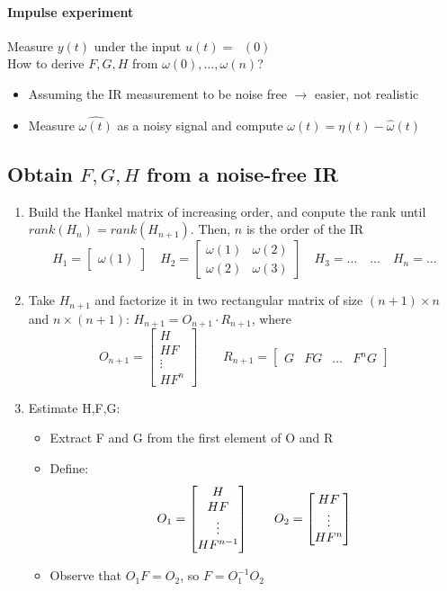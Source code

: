 \documentclass{report}
\DeclareMathOperator{\imp}{impulse(0)}
\begin{document}
\paragraph{Impulse experiment} Measure $y(t)$ under the input $u(t)=\imp (0)$\\
How to derive $F,G,H$ from $\omega(0),\dots,\omega(n)$?
\begin{itemize}
\item Assuming the IR measurement to be noise free $\rightarrow$ easier, not realistic
\item Measure $\hat{\omega(t)}$ as a noisy signal and compute $\omega(t)=\eta(t)-\hat{\omega}(t)$
\end{itemize}

\subsection{Obtain $F,G,H$ from a noise-free IR}
\begin{enumerate}
\item
	Build the Hankel matrix of increasing order, and conpute the rank until $rank(H_n)=rank(H_{n+1})$. Then, $n$ is the order of the IR
	\[
	H_1=\begin{bmatrix}
	\omega(1)
	\end{bmatrix}
	\quad
	H_2=\begin{bmatrix}
	\omega(1)&\omega(2)\\
	\omega(2)&\omega(3)
	\end{bmatrix}
	\quad
	H_3=\dots
	\quad
	\dots
	\quad
	H_n=\dots
	\]
\item Take $H_{n+1}$ and factorize it in two rectangular matrix of size $(n+1)\times n$ and $n\times (n+1)$: $H_{n+1}=O_{n+1}\cdot R_{n+1}$, where
	\[
	O_{n+1}=\begin{bmatrix}
	H\\HF\\\vdots\\HF^n
	\end{bmatrix}
	\qquad
	R_{n+1}=\begin{bmatrix}
	G&FG&\dots&F^nG
	\end{bmatrix}
	\]
\item Estimate H,F,G:
	\begin{itemize}
	\item Extract F and G from the first element of O and R
	\item Define:
	\[
	O_1=\begin{bmatrix}
	H\\HF\\\vdots\\HF^{n-1}
	\end{bmatrix}
	\qquad
	O_2=\begin{bmatrix}
	HF\\\vdots\\HF^n
	\end{bmatrix}\\
	\]
	\item Observe that $O_1F=O_2$, so $F=O_1^{-1}O_2$
	\end{itemize}	
\end{enumerate}
\end{document}
